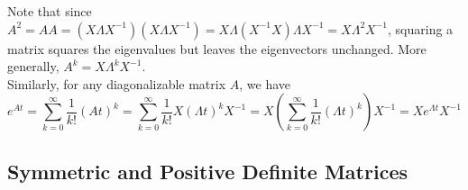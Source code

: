 \documentclass[11pt]{article}
\theoremstyle{plain}
\theoremstyle{definition}
\theoremstyle{remark}
\numberwithin{equation}{section}
\begin{document}
Note that since $A^2 = AA = (X \Lambda X^{-1}) (X \Lambda X^{-1}) = X \Lambda (X^{-1} X) \Lambda X^{-1} = X \Lambda^2 X^{-1}$, squaring a matrix squares the eigenvalues but leaves the eigenvectors unchanged. More generally, $A^k = X \Lambda^k X^{-1}$.
\\

Similarly, for any diagonalizable matrix $A$, we have
\begin{equation*}
e^{At} = \sum_{k = 0}^{\infty} \frac{1}{k!} (A t)^k = \sum_{k = 0}^{\infty} \frac{1}{k!} X (\Lambda t)^k X^{-1} = X \left( \sum_{k = 0}^{\infty} \frac{1}{k!} (\Lambda t)^k \right) X^{-1} = X e^{\Lambda t} X^{-1}
\end{equation*}



\subsection{Symmetric and Positive Definite Matrices}
\end{document}
